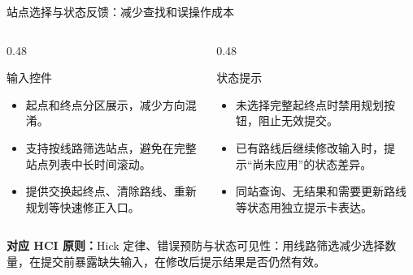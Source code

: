 \documentclass[aspectratio=169,10pt]{beamer}
\newcommand{\hciprinciple}[1]{\vspace{0.25em}\textcolor{MTRPurple}{\small\textbf{对应 HCI 原则：}#1}}
\begin{document}
\begin{frame}{站点选择与状态反馈：减少查找和误操作成本}
  \begin{columns}[T,onlytextwidth]
    \begin{column}{0.48\textwidth}
      \begin{block}{输入控件}
        \begin{itemize}
          \item 起点和终点分区展示，减少方向混淆。
          \item 支持按线路筛选站点，避免在完整站点列表中长时间滚动。
          \item 提供交换起终点、清除路线、重新规划等快速修正入口。
        \end{itemize}
      \end{block}
    \end{column}
    \begin{column}{0.48\textwidth}
      \begin{block}{状态提示}
        \begin{itemize}
          \item 未选择完整起终点时禁用规划按钮，阻止无效提交。
          \item 已有路线后继续修改输入时，提示“尚未应用”的状态差异。
          \item 同站查询、无结果和需要更新路线等状态用独立提示卡表达。
        \end{itemize}
      \end{block}
    \end{column}
  \end{columns}
  \hciprinciple{Hick 定律、错误预防与状态可见性：用线路筛选减少选择数量，在提交前暴露缺失输入，在修改后提示结果是否仍然有效。}
\end{frame}
\end{document}
